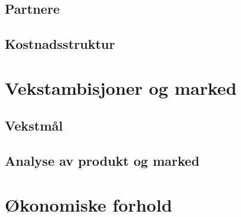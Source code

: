 \subsection{Partnere}


\subsection{Kostnadsstruktur}

\section{Vekstambisjoner og marked}


\subsection{Vekstmål}

\subsection{Analyse av produkt og marked}

\section{Økonomiske forhold}

